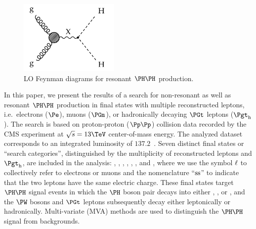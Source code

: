 \begin{figure}[h!]
\setlength{\unitlength}{1mm}
\begin{center}
\includegraphics*[height=36mm]{figures/ggHH_resonant.pdf}
\end{center}
\caption{
  LO Feynman diagrams for resonant $\HH$ production.
}
\label{fig:Feynman_ggHH_resonant}
\end{figure}

In this paper, we present the results of a search for non-resonant as well as resonant $\HH$ production
in final states with multiple reconstructed leptons, i.e.\ electrons ($\Pe$), muons ($\PGm$), or hadronically decaying $\PGt$ leptons ($\tauh$).
The search is based on proton-proton ($\Pp\Pp$) collision data recorded by the CMS experiment at $\sqrt{s} = 13\TeV$ center-of-mass energy.
The analyzed dataset corresponds to an integrated luminosity of $137.2$~\fbinv.
Seven distinct final states or ``search categories'', distinguished by the multiplicity of reconstructed leptons and $\tauh$, are included in the analysis:
\twoLeptonssZeroTau, \threeLeptonZeroTau, \fourLeptonZeroTau, \threeLeptonOneTau, \twoLeptonTwoTau, \oneLeptonThreeTau, and \zeroLeptonFourTau,
where we use the symbol $\Plepton$ to collectively refer to electrons or muons and the nomenclature ``$\ss$'' to indicate that the two leptons have the same electric charge. 
These final states target $\HH$ signal events in which the $\PHiggs$ boson pair decays into either \WWWW, \WWtt, or \tttt,
and the $\PW$ bosons and $\PGt$ leptons subsequently decay either leptonically or hadronically.
Multi-variate (MVA) methods are used to distinguish the $\HH$ signal from backgrounds.

